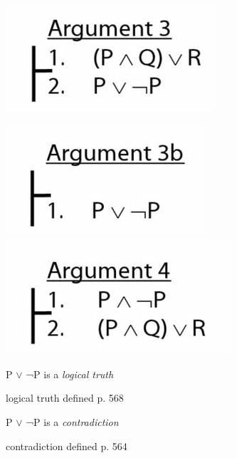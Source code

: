 \documentclass[12pt]{extarticle}
\begin{document}
\begin{multicols*}{3}
\begin{center}
\includegraphics[scale=0.3]{img/unit_160_argument3.png}
\end{center}
\begin{center}
\includegraphics[scale=0.3]{img/unit_160_argument3b.png}
\includegraphics[scale=0.3]{img/unit_160_argument4.png}
\end{center}
P $\lor{}$ ¬P is a \emph{logical truth}
 
logical truth defined p. 568
 
P $\lor{}$ ¬P is a \emph{contradiction}
 
contradiction defined p. 564
% 
% 
% 
% 
% 
% 
% 
% 
%
% 

\end{multicols*}
\end{document}
